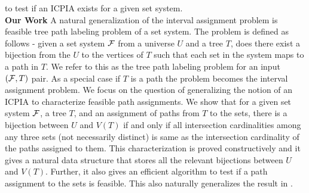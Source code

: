 \documentclass{fsttcs}
\def\cF{{\cal F}}
\begin{document}
\cite{wlh02} to test if an ICPIA exists for a given set system.\\
{\bf Our Work}
A natural generalization of the interval assignment problem is
feasible tree path labeling problem of a set system. The problem is
defined as follows - given a set system 
$\cF$ from a universe $U$ and a tree $T$, does there exist a bijection
from the $U$ to the vertices of $T$ such that each set in the system
maps to a path in $T$.  We refer to this as the tree path labeling
problem for an input $(\cF,T)$ pair. As a special case if $T$ is a path
the problem becomes the interval assignment problem.  We focus on the
question of generalizing the notion of an ICPIA \cite{nsnrs09} to
characterize feasible path assignments.  We show that for a given set
system $\cF$, a tree $T$, and an assignment of paths from $T$ to the sets,
there is a bijection between $U$ and $V(T)$ if and only if all
intersection cardinalities among any three sets (not necessarily distinct)
is same as the intersection cardinality of the paths assigned to them.
This characterization is proved constructively and it gives a natural
data structure that stores all the relevant bijections between $U$ and
$V(T)$.  Further, it also gives an efficient algorithm to test if a
path assignment to the sets is feasible.  This also naturally
generalizes the result in \cite{nsnrs09}.
 
\end{document}
